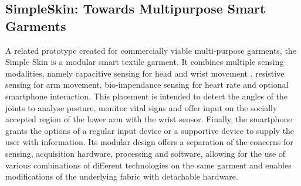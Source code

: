 \documentclass{sigchi}
\begin{document}
\subsection{SimpleSkin: Towards Multipurpose Smart Garments}
A related prototype created for commercially viable multi-purpose garments, the Simple Skin \cite{simpleskin} is a modular smart textile garment. It combines multiple sensing modalities, namely capacitive sensing for head and wrist movement , resistive sensing for arm movement, bio-impendance sensing for heart rate and optional smartphone interaction. This placement is intended to detect the angles of the joints to analyse posture, monitor vital signs and offer input on the socially accepted region of the lower arm with the wrist sensor. Finally, the smartphone grants the options of a regular input device or a supportive device to supply the user with  information. Its modular design offers a separation of the concerns for sensing, acquisition hardware, processing and software, allowing for the use of various combinations of different technologies on the same garment and enables modifications of the underlying fabric with detachable hardware.
\end{document}
